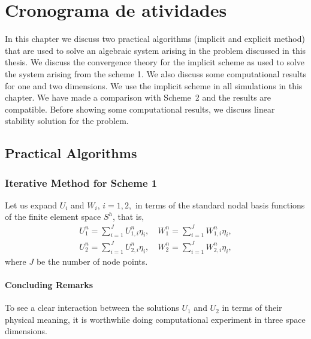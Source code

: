 \chapter{Cronograma de atividades}
In this chapter we discuss two practical algorithms (implicit and
explicit method) that are used to solve an
algebraic system arising in the problem discussed in this thesis.   We discuss the convergence theory for the
implicit scheme as used  to solve the system arising from the scheme
1.   We also
discuss  some computational results for  one and
two dimensions. We use the implicit scheme in all
simulations in this chapter. We have made a comparison with Scheme~2
and the results are compatible. Before showing some computational results, we discuss linear stability solution for the problem.
\setcounter{equation}{0}
\section{Practical Algorithms}
\subsection{Iterative  Method for Scheme 1 \label{implicit}}
Let us expand $U_i$ and $W_i$, $i=1,2,$  in terms of the standard
nodal basis functions of the finite element space $S^h$, that
is,
\eqlabon 
\begin{align}
U^n_1=\sum_{i=1}^{J}U_{1,i}^n\eta_i,\quad W^n_1=\sum_{i=1}^{J}W_{1,i}^n\eta_i,\label{5E0001a}\\
U^n_2=\sum_{i=1}^{J}U_{2,i}^n\eta_i,\quad W^n_2=\sum_{i=1}^{J}W_{2,i}^n\eta_i,\label{5E0001b}
\end{align}
where $J$ be the number of node points. 
\eqlaboff

\subsubsection{Concluding Remarks}
To see a clear interaction between the solutions $U_1$ and $U_2$ in
terms of their physical meaning, it is worthwhile doing computational
experiment in three space dimensions.














